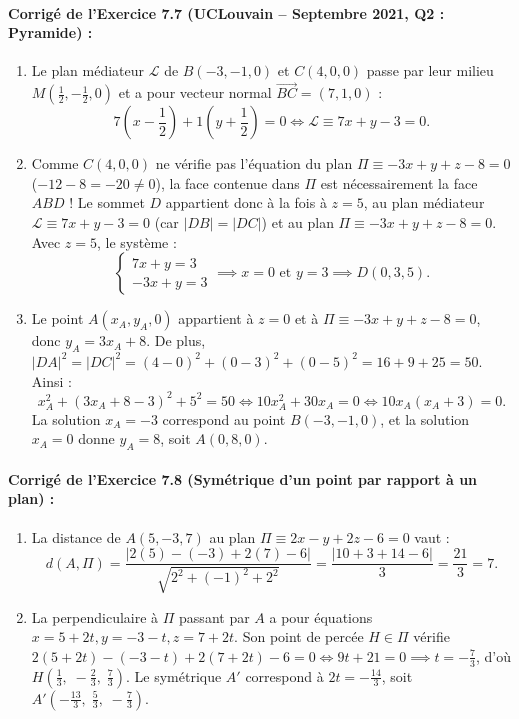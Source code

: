 \paragraph{Corrigé de l'Exercice 7.7 (UCLouvain -- Septembre 2021, Q2 : Pyramide) :}
\begin{enumerate}[label=(\alph*)]
    \item Le plan médiateur $\mathcal{L}$ de $B(-3,-1,0)$ et $C(4,0,0)$ passe par leur milieu $M\left(\frac{1}{2}, -\frac{1}{2}, 0\right)$ et a pour vecteur normal $\overrightarrow{BC} = (7, 1, 0)$ :
    \[
        7\left(x - \frac{1}{2}\right) + 1\left(y + \frac{1}{2}\right) = 0 \iff \boxed{\mathcal{L} \equiv 7x + y - 3 = 0}.
    \]
    \item Comme $C(4,0,0)$ ne vérifie pas l'équation du plan $\Pi \equiv -3x + y + z - 8 = 0$ ($-12 - 8 = -20 \neq 0$), la face contenue dans $\Pi$ est nécessairement la face $ABD$ ! Le sommet $D$ appartient donc à la fois à $z = 5$, au plan médiateur $\mathcal{L} \equiv 7x + y - 3 = 0$ (car $|DB| = |DC|$) et au plan $\Pi \equiv -3x + y + z - 8 = 0$. Avec $z = 5$, le système :
    \[
        \begin{cases} 7x + y = 3 \\ -3x + y = 3 \end{cases} \implies x = 0 \text{ et } y = 3 \implies \boxed{D(0, 3, 5)}.
    \]
    \item Le point $A(x_A, y_A, 0)$ appartient à $z = 0$ et à $\Pi \equiv -3x + y + z - 8 = 0$, donc $y_A = 3x_A + 8$. De plus, $|DA|^2 = |DC|^2 = (4-0)^2 + (0-3)^2 + (0-5)^2 = 16 + 9 + 25 = 50$. Ainsi :
    \[
        x_A^2 + (3x_A + 8 - 3)^2 + 5^2 = 50 \iff 10x_A^2 + 30x_A = 0 \iff 10x_A(x_A + 3) = 0.
    \]
    La solution $x_A = -3$ correspond au point $B(-3,-1,0)$, et la solution $x_A = 0$ donne $y_A = 8$, soit $\boxed{A(0, 8, 0)}$.
\end{enumerate}

\paragraph{Corrigé de l'Exercice 7.8 (Symétrique d'un point par rapport à un plan) :}
\begin{enumerate}[label=(\alph*)]
    \item La distance de $A(5, -3, 7)$ au plan $\Pi \equiv 2x - y + 2z - 6 = 0$ vaut :
    \[
        d(A, \Pi) = \frac{|2(5) - (-3) + 2(7) - 6|}{\sqrt{2^2 + (-1)^2 + 2^2}} = \frac{|10 + 3 + 14 - 6|}{3} = \frac{21}{3} = \boxed{7}.
    \]
    \item La perpendiculaire à $\Pi$ passant par $A$ a pour équations $x = 5 + 2t, y = -3 - t, z = 7 + 2t$. Son point de percée $H \in \Pi$ vérifie $2(5+2t) - (-3-t) + 2(7+2t) - 6 = 0 \iff 9t + 21 = 0 \implies t = -\frac{7}{3}$, d'où $\boxed{H\left(\frac{1}{3},\; -\frac{2}{3},\; \frac{7}{3}\right)}$. Le symétrique $A'$ correspond à $2t = -\frac{14}{3}$, soit $\boxed{A'\left(-\frac{13}{3},\; \frac{5}{3},\; -\frac{7}{3}\right)}$.
\end{enumerate}

